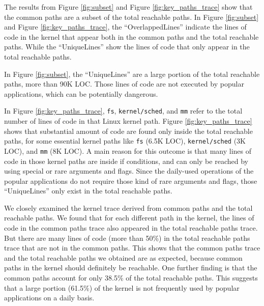 The results from Figure \ref{fig:subset} and Figure
\ref{fig:key_paths_trace} 
show that the common paths are a subset of the
total reachable paths. 
In Figure \ref{fig:subset} and Figure \ref{fig:key_paths_trace}, 
the ``OverlappedLines'' indicate the lines of code 
in the kernel that appear both in the common paths and the total reachable 
paths. While the ``UniqueLines'' show the lines of code that only appear in 
the total reachable paths.

In Figure \ref{fig:subset}, the ``UniqueLines'' 
are a large portion of the total reachable paths, more than 90K LOC. 
Those lines of code are not executed by popular applications, which can be 
potentially dangerous. 

In Figure \ref{fig:key_paths_trace}, \texttt{fs}, \texttt{kernel/sched}, 
and \texttt{mm} refer to the total number of lines of code in that Linux kernel path. 
Figure \ref{fig:key_paths_trace} shows that 
substantial amount of code are found only inside the total reachable paths, 
for some essential kernel paths like \texttt{fs} (6.5K LOC), 
\texttt{kernel/sched} (3K LOC), 
and \texttt{mm} (8K LOC). 
A main reason for this outcome is that many lines of code in those kernel paths 
are inside if conditions, and can only be reached by using special or 
rare arguments and flags. Since the daily-used operations of 
the popular applications do not require those kind of rare arguments 
and flags, those ``UniqueLines'' only exist in the total reachable paths. 

We closely examined the kernel trace derived from common paths
and the total reachable paths. We found that for each different path
in the kernel, the lines of code 
in the common paths trace also appeared in the total reachable paths trace.
But there are many lines of code (more than 50\%) 
in the total reachable paths trace that are not in the common paths. This
shows that the common paths trace and 
the total reachable paths we obtained are as expected, because common paths in
the kernel should definitely be reachable.  
One further finding is that the common paths account
for only 38.5\% of the total reachable paths. 
This suggests that a large portion (61.5\%) of the kernel is not frequently
used by popular applications on a daily basis.

